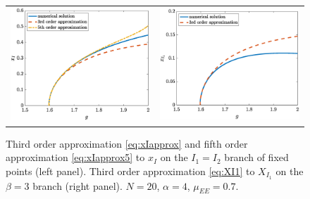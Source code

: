\documentclass[11pt,reqno]{amsart}
\begin{document}
\begin{figure}
    \centering
    \begin{tabular}{cc}
    \includegraphics[width=8cm]{images/Xiapprox.eps} &
    \includegraphics[width=8cm]{images/Xiapproxbeta3.eps} 
    \end{tabular}
    \caption{Third order approximation \cref    {eq:xIapprox} and fifth order approximation \cref{eq:xIapprox5} to $x_I$ on the $I_1=I_2$ branch of fixed points (left panel). Third order approximation \cref{eq:XI1} to $X_{I_1}$ on the $\beta=3$ branch (right panel). $N = 20$,  $\alpha = 4$, $\mu_{EE} = 0.7$.}
    \label{fig:xIapprox}
\end{figure}
\end{document}
